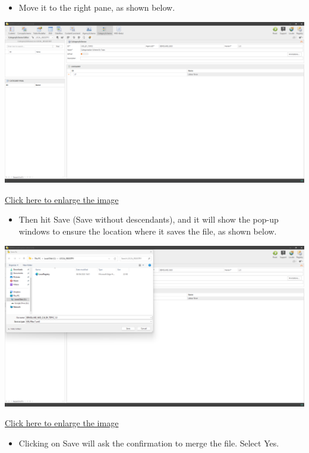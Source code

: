 \documentclass[
]{book}
\providecommand{\tightlist}{%
  \setlength{\itemsep}{0pt}\setlength{\parskip}{0pt}}
\begin{document}
\begin{itemize}
\tightlist
\item
  Move it to the right pane, as shown below.
\end{itemize}

\begin{center}\includegraphics[width=1\linewidth]{./images/image176} \end{center}

\href{images/image176.png}{Click here to enlarge the image}

\begin{itemize}
\tightlist
\item
  Then hit Save (Save without descendants), and it will show the pop-up windows to ensure the location where it saves the file, as shown below.
\end{itemize}

\begin{center}\includegraphics[width=1\linewidth]{./images/image178} \end{center}

\href{images/image178.png}{Click here to enlarge the image}

\begin{itemize}
\tightlist
\item
  Clicking on Save will ask the confirmation to merge the file. Select Yes.
\end{itemize}
\end{document}
